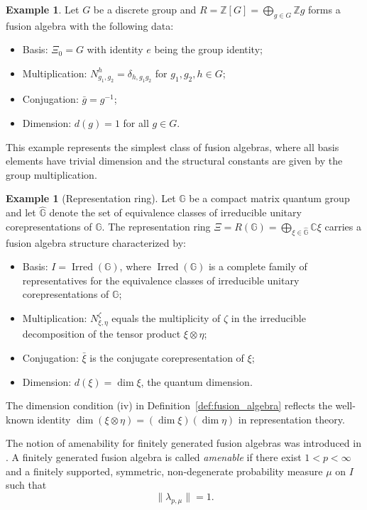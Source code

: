 \documentclass[12pt, reqno]{amsart}
\theoremstyle{definition}
\newtheorem{example}[theorem]{Example}
\theoremstyle{remark}
\numberwithin{equation}{section}
\DeclareMathOperator{\Irred}{Irred}
\begin{document}
\begin{example}\label{ex:group-algebra}
Let $G$ be a discrete group and $R = \mathbb{Z}[G] = \bigoplus_{g \in G} \mathbb{Z}g$ forms a fusion algebra 
with the following data:
\begin{itemize}
    \item Basis: $\Xi_0 = G$ with identity $e$ being the group identity;
    \item Multiplication: $N_{g_1,g_2}^{h} = \delta_{h,g_1g_2}$ for 
    $g_1, g_2, h \in G$;
    \item Conjugation: $\bar{g} = g^{-1}$;
    \item Dimension: $d(g) = 1$ for all $g \in G$.
\end{itemize}
This example represents the simplest class of fusion algebras, where all 
basis elements have trivial dimension and the structural constants are given 
by the group multiplication.
\end{example}

\begin{example}[Representation ring]\label{ex:rep-ring}
Let $\mathbb{G}$ be a compact matrix quantum group and let 
$\widehat{\mathbb{G}}$ denote the set of equivalence classes of irreducible 
unitary corepresentations of $\mathbb{G}$. The representation ring 
$\Xi = R(\mathbb{G}) = \bigoplus_{\xi \in \widehat{\mathbb{G}}} \mathbb{C}\xi$ 
carries a fusion algebra structure characterized by:
\begin{itemize}
    \item Basis: $I = \Irred(\mathbb{G})$, where $\Irred(\mathbb{G})$ is a 
    complete family of representatives for the equivalence classes of 
    irreducible unitary corepresentations of $\mathbb{G}$;
    \item Multiplication: $N_{\xi,\eta}^{\zeta}$ equals the multiplicity of 
    $\zeta$ in the irreducible decomposition of the tensor product 
    $\xi \otimes \eta$;
    \item Conjugation: $\bar{\xi}$ is the conjugate corepresentation of $\xi$;
    \item Dimension: $d(\xi) = \dim \xi$, the quantum dimension.
\end{itemize}
The dimension condition (iv) in Definition~\ref{def:fusion_algebra} reflects 
the well-known identity $\dim(\xi \otimes \eta) = (\dim \xi)(\dim \eta)$ in 
representation theory.
\end{example}

The notion of amenability for finitely generated fusion algebras was 
introduced in \cite{14}. A finitely generated fusion algebra is called 
\emph{amenable} if there exist $1 < p < \infty$ and a finitely supported, 
symmetric, non‑degenerate probability measure $\mu$ on $I$ such that
\[
\|\lambda_{p,\mu}\| = 1.
\]
\end{document}
